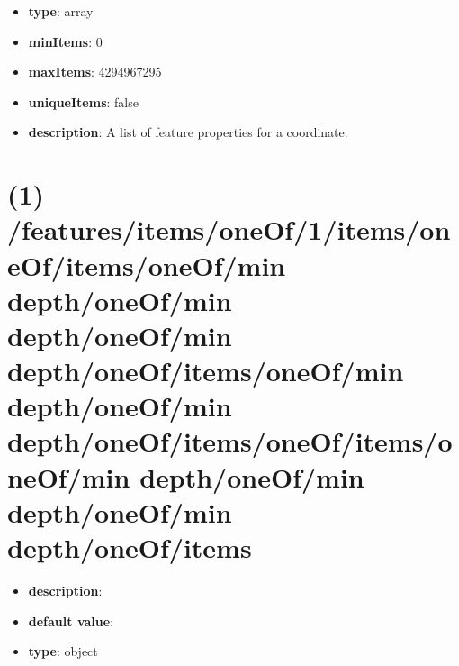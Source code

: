 \begin{itemize}[leftmargin=0em]\item {\bf type}: array
\item {\bf minItems}: 0
\item {\bf maxItems}: 4294967295
\item {\bf uniqueItems}: false
\item {\bf description}: A list of feature properties for a coordinate.
\end{itemize}\section{(1) /features/items/oneOf/1/items/oneOf/items/oneOf/min depth/oneOf/min depth/oneOf/min depth/oneOf/items/oneOf/min depth/oneOf/min depth/oneOf/items/oneOf/items/oneOf/min depth/oneOf/min depth/oneOf/min depth/oneOf/items}
\begin{itemize}[leftmargin=1em]\item {\bf description}: 
\item {\bf default value}: 
\item {\bf type}: object
\end{itemize}
